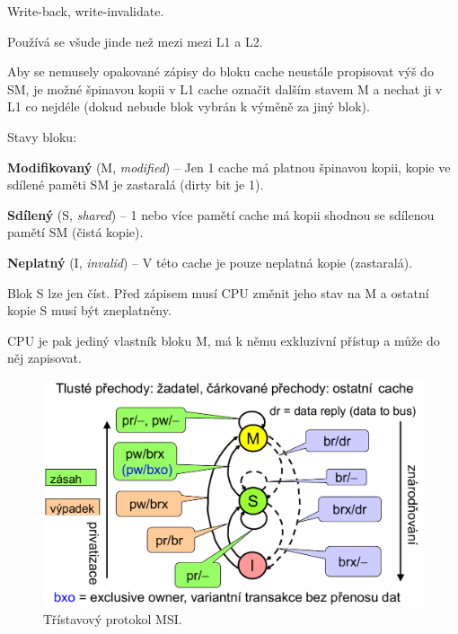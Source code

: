 \begin{compactitem}
    \item Write-back, write-invalidate.
    \item Používá se všude jinde než mezi mezi L1 a L2.

    \item Aby se nemusely opakované zápisy do bloku cache neustále propisovat výš do SM, je možné špinavou kopii v L1 cache označit dalším stavem M a nechat ji v L1 co nejdéle (dokud nebude blok vybrán k výměně za jiný blok).

    \item Stavy bloku: \begin{compactitem}
        \item \textbf{Modifikovaný} (M, \textit{modified}) -- Jen 1 cache má platnou špinavou kopii, kopie ve sdílené paměti SM je zastaralá (dirty bit je 1).
        \item \textbf{Sdílený} (S, \textit{shared}) -- 1 nebo více pamětí cache má kopii shodnou se sdílenou pamětí SM (čistá kopie).
        \item \textbf{Neplatný} (I, \textit{invalid}) -- V této cache je pouze neplatná kopie (zastaralá).
    \end{compactitem}

    \item Blok S lze jen číst. Před zápisem musí CPU změnit jeho stav na M a
    ostatní kopie S musí být zneplatněny.

    \item CPU je pak jediný vlastník bloku M, má k němu exkluzivní přístup a
    může do něj zapisovat.

    \begin{figure}[H]
        \centering
        \includegraphics[width=0.9\linewidth]{msi.pdf}
        \caption{Třístavový protokol MSI.}
    \end{figure}
\end{compactitem}

